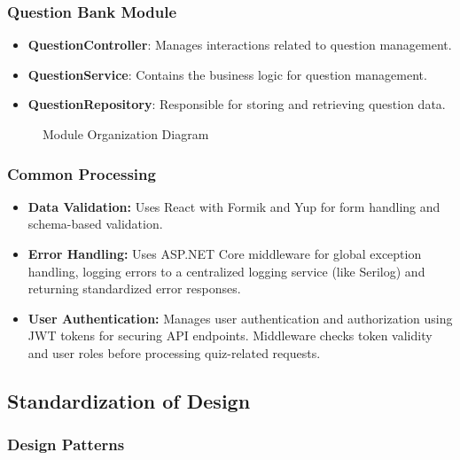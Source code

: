 \subsubsection{Question Bank Module}

\begin{itemize}
  \item \textbf{QuestionController}: Manages interactions related to question management.
  \item \textbf{QuestionService}: Contains the business logic for question management.
  \item \textbf{QuestionRepository}: Responsible for storing and retrieving question data.
\end{itemize}

\begin{figure}[htbp]
  \centering
  \caption{Module Organization Diagram}
  \label{fig:development}
\end{figure}


\subsubsection{Common Processing}

\begin{itemize}
  \item \textbf{Data Validation:} Uses React with Formik and Yup for form handling and schema-based validation.

  \item \textbf{Error Handling:} Uses ASP.NET Core middleware for global exception handling, logging errors to a centralized logging service (like Serilog) and returning standardized error responses.

  \item \textbf{User Authentication:} Manages user authentication and authorization using JWT tokens for securing API endpoints. Middleware checks token validity and user roles before processing quiz-related requests.
\end{itemize}


\subsection{Standardization of Design}

\subsubsection{Design Patterns}

